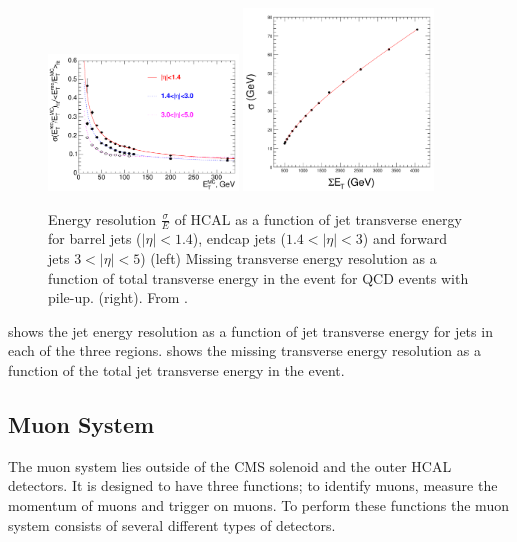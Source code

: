 \begin{figure}[htbp]
  \centering
  \includegraphics[width=0.45\textwidth]{hcal_performance}
  \includegraphics[width=0.45\textwidth]{met_res}
  \caption{Energy resolution $\frac{\sigma}{E}$ of HCAL as a function of jet
  \label{fig:HCAL}
transverse energy for barrel jets ($|\eta| < 1.4$), endcap jets ($1.4<|\eta| <
3$) and forward jets $3<|\eta| < 5$) (left)
Missing transverse energy resolution as a function of total transverse energy in
the event for QCD events with pile-up. (right). From \cite{cms}.}
\end{figure}

 shows the jet energy resolution as a function of jet
transverse energy for jets in each of the three regions. 
shows the missing transverse energy resolution as a function of the total jet
transverse energy in the event.

\subsection{Muon System}
The muon system lies outside of the CMS solenoid and the outer HCAL detectors.
It is designed to have three functions; to identify muons, measure the momentum
of muons and trigger on muons. To perform these functions the muon system
consists of several different types of detectors.

